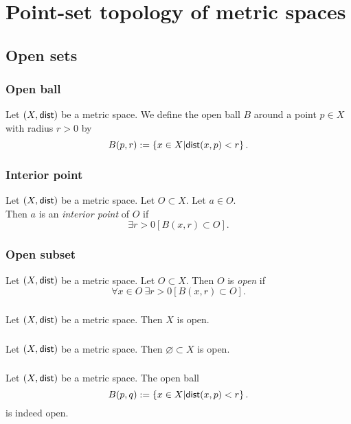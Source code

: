 \section{Point-set topology of metric spaces}

\subsection{Open sets}
\subsubsection*{Open ball}
\udef Let $(X, \mathsf{dist})$ be a metric space. We define the open ball $B$ around
a point $p \in X$ with radius $r > 0$ by
\[
    B(p,r) := \left\{ x \in X \middle| \mathsf{dist}(x,p) < r \right\}.
\]

\subsubsection*{Interior point}
Let $(X, \mathsf{dist})$ be a metric space.
Let $O \subset X$. Let $a \in O$.\\
Then $a$ is an \emph{interior point} of $O$ if
\[
    \exists r > 0 \left[ B(x,r) \subset O \right].
\]

\subsubsection*{Open subset}
\udef Let $(X, \mathsf{dist})$ be a metric space.
Let $O \subset X$. Then $O$ is \emph{open} if
\[
    \forall x \in O\ \exists r > 0 \left[ B(x,r) \subset O \right].
\]

\subsubsection*{}
\uprop Let $(X, \mathsf{dist})$ be a metric space. Then $X$ is open.

\subsubsection*{}
\uprop Let $(X, \mathsf{dist})$ be a metric space. Then $\varnothing \subset X$ is open.

\subsubsection*{}
\uprop Let $(X, \mathsf{dist})$ be a metric space. The open ball
\[
    B(p,q) := \left\{ x \in X \middle| \mathsf{dist}(x,p) < r \right\}.
\]
is indeed open.

